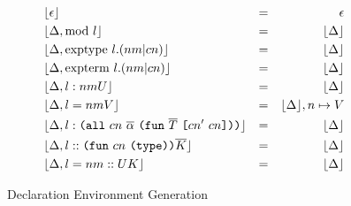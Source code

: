 \documentclass[../main.tex]{subfiles}
\begin{document}
\begin{figure}[t]
    
    \begin{align*}
        & \lfloor{}\epsilon{}\rfloor{}                                             & = && \epsilon{} \\
        & \lfloor{}\Delta,\mathrm{mod} ~ l\rfloor{}                                        & = && \lfloor{}\Delta\rfloor{} \\
        & \lfloor{}\Delta,\mathrm{exptype} ~ l.(nm|cn)\rfloor{}                        & = && \lfloor{}\Delta\rfloor{} \\
        & \lfloor{}\Delta,\mathrm{expterm} ~ l.(nm|cn)\rfloor{}                        & = && \lfloor{}\Delta\rfloor{} \\
        & \lfloor{}\Delta,l : nm{U}\rfloor{}                             & = && \lfloor{}\Delta\rfloor{} \\
        & \lfloor{}\Delta,l = nm{V}\rfloor{}                                  & = && \lfloor{}\Delta\rfloor{}, n \mapsto V \\
        & \lfloor{}\Delta,l : \texttt{(} \texttt{all} ~ cn ~ \overline{\alpha} ~ \texttt{(} \texttt{fun} ~ \overline{T} ~ \texttt{[} cn' ~ cn \texttt{]} \texttt{)} \texttt{)}\rfloor{} & = && \lfloor{}\Delta\rfloor{} \\
        & \lfloor{}\Delta,l :: \texttt{(} \texttt{fun} ~ cn ~ \texttt{(} \texttt{type} \texttt{)}{} \texttt{)}{\overline{K}}\rfloor{}                   & = && \lfloor{}\Delta\rfloor{} \\
        & \lfloor{}\Delta,l = nm :: U{K}\rfloor{}                          & = && \lfloor{}\Delta\rfloor{} \\
    \end{align*}
    
    \caption{Declaration Environment Generation}
    \label{fig:Plutus_core_decl_env}
\end{figure}
\end{document}
